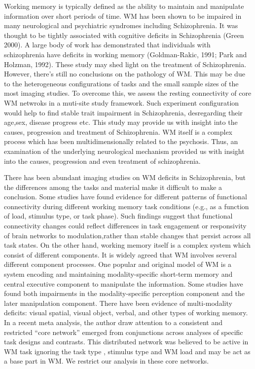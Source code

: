 \documentclass[preprint,authoryear,review,12pt,times]{elsarticle}
\begin{document}
Working memory is typically defined as the ability to maintain and manipulate information over short periods of time. WM has been shown to be impaired in many neurological and psychiatric syndromes including Schizophrenia. It was thought to be tightly associated with cognitive deficits in Schizophrenia (Green 2000). A large body of work has demonstrated that individuals with schizophrenia have deficits in working memory (Goldman-Rakic, 1991; Park and Holzman, 1992). These study may shed light on the treatment of Schizophrenia. However, there's still no conclusions on the pathology of WM. This may be due to the heterogeneous configurations of tasks and the small sample sizes of the most imaging studies. To overcome this, we assess the resting connectivity of core WM netwroks in a muti-site study framework. Such experiment configuration would help to find stable trait impairment in Schizophrenia, desregarding their age,sex, disease progress etc. This study may provide us with insight into the causes, progression and treatment of Schizophrenia. WM itself is a complex process which has been multidimensionally related to the psychosis. Thus, an examination of the underlying neurological mechanism provided us with insight into the causes, progression and even treatment of schizophrenia. 

There has been abundant imaging studies on WM deficits in Schizophrenia, but the differences among the tasks and material make it difficult to make a conclusion.  Some studies have found evidence for different patterns of functional connectivity during different working memory task conditions (e.g., as a function of load, stimulus type, or task phase). Such findings suggest that functional connectivity changes could reflect differences in task engagement or responsivity of brain networks to modulation,rather than stable changes that persist across all task states. On the other hand, working memory itself is a complex system which consist of different components. It is widely agreed that WM involves several different component processes. One popular and original model of WM is a system encoding and maintaining modality-specific short-term memory and central executive component to manipulate the information. Some studies have found both impairments in the modality-specific perception component and the later manipulation component. There have been evidence of multi-modality deficits: visual spatial, visual object, verbal, and other types of working memory. In a recent meta analysis, the author draw attention to a consistent and restricted ``core network'' emerged from conjunctions across analyses of specific task designs and contrasts. This distributed network was believed to be active in WM task ignoring the task type , stimulus type and WM load and may be act as a base part in WM. We restrict our analysis in these core networks.
\end{document}
